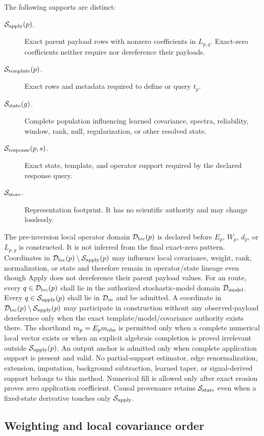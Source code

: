 The following supports are distinct:
\begin{description}
\item[$\mathcal{S}_{\rm apply}(p)$.] Exact parent payload rows with nonzero
coefficients in $L_{p,g}$. Exact-zero coefficients neither require nor
dereference their payloads.
\item[$\mathcal{S}_{\rm template}(p)$.] Exact rows and metadata required to define or
query $t_p$.
\item[$\mathcal{S}_{\rm state}(g)$.] Complete population influencing learned
covariance, spectra, reliability, window, rank, null, regularization, or other
resolved state.
\item[$\mathcal{S}_{\rm response}(p,s)$.] Exact state, template, and operator support
required by the declared response query.
\item[$\mathcal{S}_{\rm store}$.] Representation footprint. It has no scientific
authority and may change losslessly.
\end{description}
The pre-inversion local operator domain $\mathcal{D}_{\rm loc}(p)$ is declared before
$E_p$, $W_p$, $d_p$, or $L_{p,g}$ is constructed. It is not inferred from the
final exact-zero pattern. Coordinates in
$\mathcal{D}_{\rm loc}(p)\setminus\mathcal{S}_{\rm apply}(p)$ may influence local covariance,
weight, rank, normalization, or state and therefore remain in operator/state
lineage even though Apply does not dereference their parent payload values.
For an  route, every $q\in\mathcal{D}_{\rm loc}(p)$ shall lie in the
authorized stochastic-model domain $\mathcal{D}_{\rm model}$. Every
$q\in\mathcal{S}_{\rm apply}(p)$ shall lie in $\mathcal{D}_m$ and be admitted. A
coordinate in $\mathcal{D}_{\rm loc}(p)\setminus\mathcal{S}_{\rm apply}(p)$ may participate
in construction without any observed-payload dereference only when the exact
template/model/covariance authority exists there. The shorthand
$m_p=E_pm_{\rm obs}$ is permitted only when a complete numerical local vector exists or
when an explicit algebraic completion is proved irrelevant outside
$\mathcal{S}_{\rm apply}(p)$. An output anchor is admitted only when complete
application support is present and valid. No partial-support estimator, edge
renormalization, extension,
imputation, background subtraction, learned taper, or signal-derived support
belongs to this method. Numerical fill is allowed only after exact erosion
proves zero application coefficient. Causal provenance retains
$\mathcal{S}_{\rm state}$ even when a fixed-state derivative touches only
$\mathcal{S}_{\rm apply}$.

\subsection{Weighting and local covariance order}


